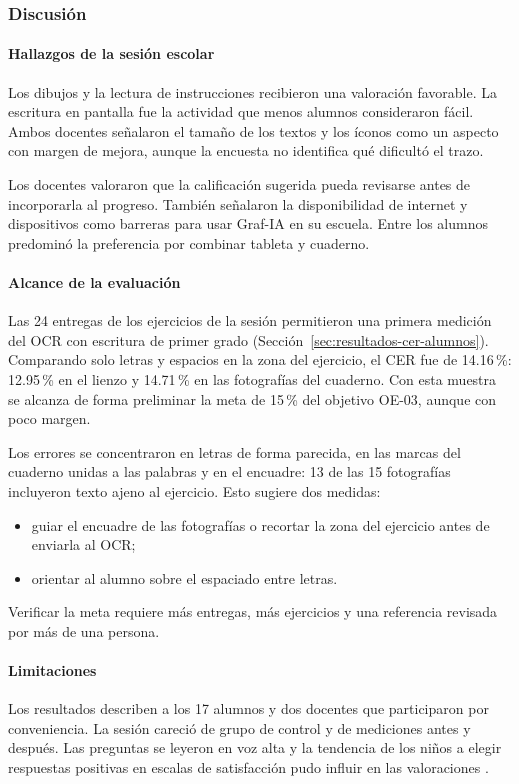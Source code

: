 \subsubsection{Discusión}
\label{sec:discusion-pruebas}

\paragraph{Hallazgos de la sesión escolar}
Los dibujos y la lectura de instrucciones recibieron una valoración favorable. La escritura en pantalla fue la actividad que menos alumnos consideraron fácil. Ambos docentes señalaron el tamaño de los textos y los íconos como un aspecto con margen de mejora, aunque la encuesta no identifica qué dificultó el trazo.

Los docentes valoraron que la calificación sugerida pueda revisarse antes de incorporarla al progreso. También señalaron la disponibilidad de internet y dispositivos como barreras para usar Graf-IA en su escuela. Entre los alumnos predominó la preferencia por combinar tableta y cuaderno.

\paragraph{Alcance de la evaluación}
Las 24 entregas de los ejercicios de la sesión permitieron una primera medición del OCR con escritura de primer grado (Sección~\ref{sec:resultados-cer-alumnos}). Comparando solo letras y espacios en la zona del ejercicio, el CER fue de 14.16\,\%: 12.95\,\% en el lienzo y 14.71\,\% en las fotografías del cuaderno. Con esta muestra se alcanza de forma preliminar la meta de 15\,\% del objetivo OE-03, aunque con poco margen.

Los errores se concentraron en letras de forma parecida, en las marcas del cuaderno unidas a las palabras y en el encuadre: 13 de las 15 fotografías incluyeron texto ajeno al ejercicio. Esto sugiere dos medidas:
\begin{itemize}
    \item guiar el encuadre de las fotografías o recortar la zona del ejercicio antes de enviarla al OCR;
    \item orientar al alumno sobre el espaciado entre letras.
\end{itemize}
Verificar la meta requiere más entregas, más ejercicios y una referencia revisada por más de una persona.

\paragraph{Limitaciones}
Los resultados describen a los 17 alumnos y dos docentes que participaron por conveniencia. La sesión careció de grupo de control y de mediciones antes y después. Las preguntas se leyeron en voz alta y la tendencia de los niños a elegir respuestas positivas en escalas de satisfacción pudo influir en las valoraciones \cite{read2006funtoolkit}.
